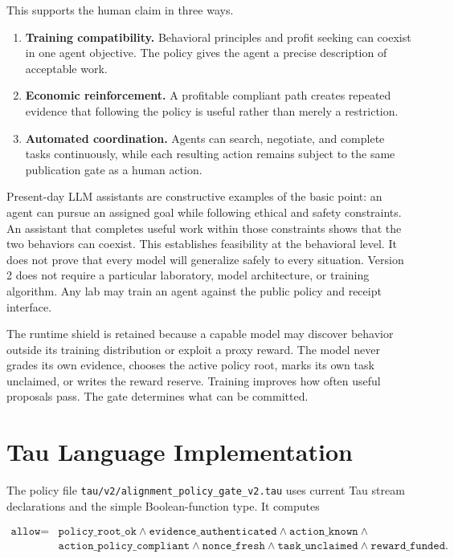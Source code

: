 \documentclass[11pt]{article}
\begin{document}
This supports the human claim in three ways.

\begin{enumerate}
  \item \textbf{Training compatibility.}  Behavioral principles and profit
  seeking can coexist in one agent objective.  The policy gives the agent a
  precise description of acceptable work.
  \item \textbf{Economic reinforcement.}  A profitable compliant path creates
  repeated evidence that following the policy is useful rather than merely a
  restriction.
  \item \textbf{Automated coordination.}  Agents can search, negotiate, and
  complete tasks continuously, while each resulting action remains subject to
  the same publication gate as a human action.
\end{enumerate}

Present-day LLM assistants are constructive examples of the basic point: an
agent can pursue an assigned goal while following ethical and safety
constraints.  An assistant that completes useful work within those constraints
shows that the two behaviors can coexist.  This establishes feasibility at the
behavioral level.  It does not prove that every model will generalize safely to
every situation.  Version 2 does not require a particular laboratory, model
architecture, or training algorithm.  Any lab may train an agent against the
public policy and receipt interface.

The runtime shield is retained because a capable model may discover behavior
outside its training distribution or exploit a proxy reward.  The model never
grades its own evidence, chooses the active policy root, marks its own task
unclaimed, or writes the reward reserve.  Training improves how often useful
proposals pass.  The gate determines what can be committed.

\section{Tau Language Implementation}

The policy file
\texttt{tau/v2/alignment\_policy\_gate\_v2.tau} uses current Tau stream
declarations and the simple Boolean-function type.  It computes

\[
\begin{split}
\texttt{allow}={}&\texttt{policy\_root\_ok}\land
\texttt{evidence\_authenticated}\land
\texttt{action\_known}\land\\
&\texttt{action\_policy\_compliant}\land
\texttt{nonce\_fresh}\land
\texttt{task\_unclaimed}\land
\texttt{reward\_funded}.
\end{split}
\]
\end{document}

